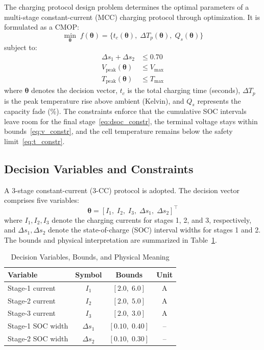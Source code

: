 \documentclass[journal]{IEEEtran}
\newcommand{\btheta}{\boldsymbol{\theta}}
\begin{document}
The charging protocol design problem determines the optimal parameters of a multi-stage constant-current (MCC) charging protocol through optimization. It is formulated as a CMOP:
\begin{equation}
\min_{\btheta} \; f(\btheta) = \{t_c(\btheta),\; \Delta T_p(\btheta),\; Q_s(\btheta)\}
\label{eq:cmop}
\end{equation}
subject to:
\begin{align}
\Delta s_1 + \Delta s_2 &\leq 0.70 \label{eq:dsoc_constr}\\
V_{\text{peak}}(\btheta) &\leq V_{\max} \label{eq:v_constr}\\
T_{\text{peak}}(\btheta) &\leq T_{\max} \label{eq:t_constr}
\end{align}
where $\btheta$ denotes the decision vector, $t_c$ is the total charging time (seconds), $\Delta T_p$ is the peak temperature rise above ambient (Kelvin), and $Q_s$ represents the capacity fade (\%). The constraints enforce that the cumulative SOC intervals leave room for the final stage~\eqref{eq:dsoc_constr}, the terminal voltage stays within bounds~\eqref{eq:v_constr}, and the cell temperature remains below the safety limit~\eqref{eq:t_constr}.

\subsection{Decision Variables and Constraints}

A 3-stage constant-current (3-CC) protocol is adopted. The decision vector comprises five variables:
\begin{equation}
\btheta = [I_1,\; I_2,\; I_3,\; \Delta s_1,\; \Delta s_2]^\top
\label{eq:theta}
\end{equation}
where $I_1, I_2, I_3$ denote the charging currents for stages 1, 2, and 3, respectively, and $\Delta s_1, \Delta s_2$ denote the state-of-charge (SOC) interval widths for stages 1 and 2. The bounds and physical interpretation are summarized in Table~\ref{tab:variables}.

\begin{table}[!t]
\caption{Decision Variables, Bounds, and Physical Meaning}
\label{tab:variables}
\centering
\begin{tabular}{lccc}
\toprule
Variable & Symbol & Bounds & Unit \\
\midrule
Stage-1 current & $I_1$ & $[2.0,\; 6.0]$ & A \\
Stage-2 current & $I_2$ & $[2.0,\; 5.0]$ & A \\
Stage-3 current & $I_3$ & $[2.0,\; 3.0]$ & A \\
Stage-1 SOC width & $\Delta s_1$ & $[0.10,\; 0.40]$ & -- \\
Stage-2 SOC width & $\Delta s_2$ & $[0.10,\; 0.30]$ & -- \\
\bottomrule
\end{tabular}
\end{table}
\end{document}
